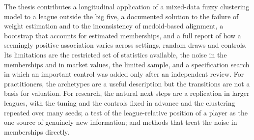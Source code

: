 The thesis contributes a longitudinal application of a mixed-data fuzzy clustering model to a league outside the big five, a documented solution to the failure of weight estimation and to the inconsistency of medoid-based alignment, a bootstrap that accounts for estimated memberships, and a full report of how a seemingly positive association varies across settings, random draws and controls. Its limitations are the restricted set of statistics available, the noise in the memberships and in market values, the limited sample, and a specification search in which an important control was added only after an independent review. For practitioners, the archetypes are a useful description but the transitions are not a basis for valuation. For research, the natural next steps are a replication in larger leagues, with the tuning and the controls fixed in advance and the clustering repeated over many seeds; a test of the league-relative position of a player as the one source of genuinely new information; and methods that treat the noise in memberships directly.
